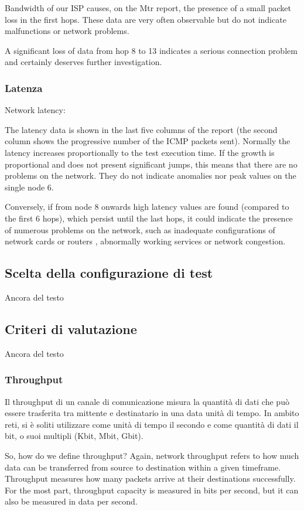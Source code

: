 Bandwidth of our ISP causes, on the Mtr report, the presence of a small packet loss in the first hops. These data are very often observable but do not indicate malfunctions or network problems.

A significant loss of data from hop 8 to 13 indicates a serious connection problem and certainly deserves further investigation.

\subsubsection{Latenza}
Network latency:

The latency data is shown in the last five columns of the report (the second column shows the progressive number of the ICMP packets sent). Normally the latency increases proportionally to the test execution time. If the growth is proportional and does not present significant jumps, this means that there are no problems on the network. They do not indicate anomalies nor peak values on the single node 6.

Conversely, if from node 8 onwards high latency values are found (compared to the first 6 hops), which persist until the last hops, it could indicate the presence of numerous problems on the network, such as inadequate configurations of network cards or routers , abnormally working services or network congestion.

\subsection{Scelta della configurazione di test}
Ancora del testo

\subsection{Criteri di valutazione}
Ancora del testo

\subsubsection{Throughput}
Il throughput di un canale di comunicazione misura la quantità di dati che può essere trasferita tra mittente e destinatario in una data unità di tempo. In ambito reti, si è soliti utilizzare come unità di tempo il secondo e come quantità di dati il bit, o suoi multipli (Kbit, Mbit, Gbit).

So, how do we define throughput? Again, network throughput refers to how much data can be transferred from source to destination within a given timeframe. Throughput measures how many packets arrive at their destinations successfully. For the most part, throughput capacity is measured in bits per second, but it can also be measured in data per second.

